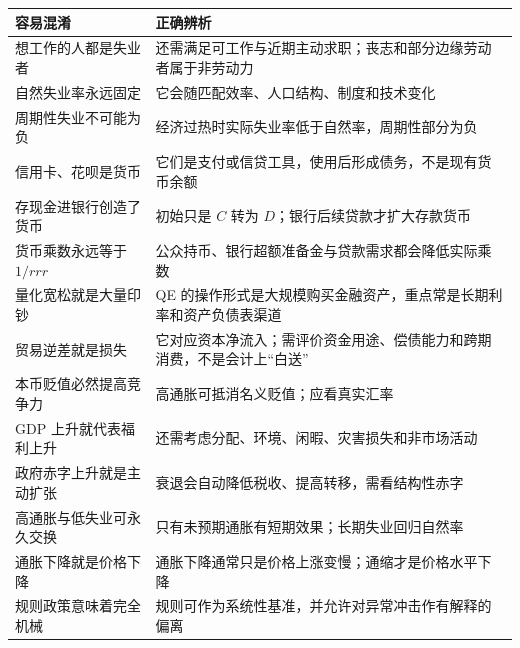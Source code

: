 \documentclass[UTF8,11pt,a4paper]{ctexart}
\begin{document}
\begin{longtable}{p{}p{}}
\toprule
容易混淆 & 正确辨析\\
\midrule
想工作的人都是失业者 & 还需满足可工作与近期主动求职；丧志和部分边缘劳动者属于非劳动力\\
自然失业率永远固定 & 它会随匹配效率、人口结构、制度和技术变化\\
周期性失业不可能为负 & 经济过热时实际失业率低于自然率，周期性部分为负\\
信用卡、花呗是货币 & 它们是支付或信贷工具，使用后形成债务，不是现有货币余额\\
存现金进银行创造了货币 & 初始只是 $C$ 转为 $D$；银行后续贷款才扩大存款货币\\
货币乘数永远等于 $1/rrr$ & 公众持币、银行超额准备金与贷款需求都会降低实际乘数\\
量化宽松就是大量印钞 & QE 的操作形式是大规模购买金融资产，重点常是长期利率和资产负债表渠道\\
贸易逆差就是损失 & 它对应资本净流入；需评价资金用途、偿债能力和跨期消费，不是会计上“白送”\\
本币贬值必然提高竞争力 & 高通胀可抵消名义贬值；应看真实汇率\\
GDP 上升就代表福利上升 & 还需考虑分配、环境、闲暇、灾害损失和非市场活动\\
政府赤字上升就是主动扩张 & 衰退会自动降低税收、提高转移，需看结构性赤字\\
高通胀与低失业可永久交换 & 只有未预期通胀有短期效果；长期失业回归自然率\\
通胀下降就是价格下降 & 通胀下降通常只是价格上涨变慢；通缩才是价格水平下降\\
规则政策意味着完全机械 & 规则可作为系统性基准，并允许对异常冲击作有解释的偏离\\
\bottomrule
\end{longtable}
\end{document}
